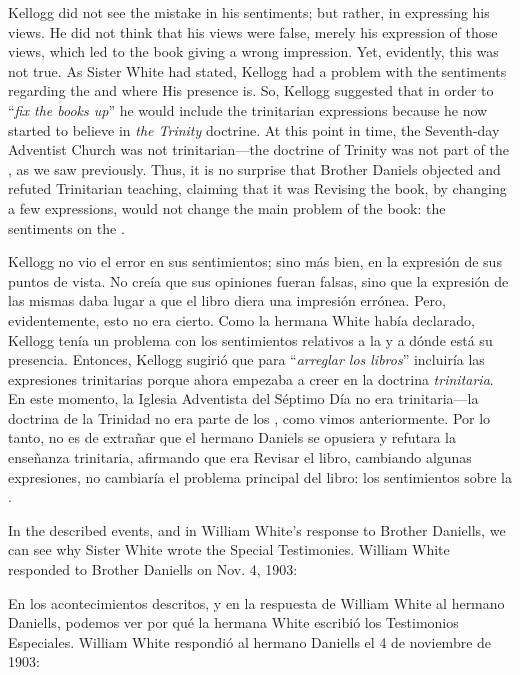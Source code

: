 Kellogg did not see the mistake in his sentiments; but rather, in expressing his views. He did not think that his views were false, merely his expression of those views, which led to the book giving a wrong impression. Yet, evidently, this was not true. As Sister White had stated, Kellogg had a problem with the sentiments regarding the  and where His presence is. So, Kellogg suggested that in order to “\textit{fix the books up}” he would include the trinitarian expressions because he now started to believe in \textit{the Trinity} doctrine. At this point in time, the Seventh-day Adventist Church was not trinitarian—the doctrine of Trinity was not part of the , as we saw previously. Thus, it is no surprise that Brother Daniels objected and refuted Trinitarian teaching, claiming that it was Revising the book, by changing a few expressions, would not change the main problem of the book: the sentiments on the .


Kellogg no vio el error en sus sentimientos; sino más bien, en la expresión de sus puntos de vista. No creía que sus opiniones fueran falsas, sino que la expresión de las mismas daba lugar a que el libro diera una impresión errónea. Pero, evidentemente, esto no era cierto. Como la hermana White había declarado, Kellogg tenía un problema con los sentimientos relativos a la  y a dónde está su presencia. Entonces, Kellogg sugirió que para “\textit{arreglar los libros}” incluiría las expresiones trinitarias porque ahora empezaba a creer en la doctrina \textit{trinitaria}. En este momento, la Iglesia Adventista del Séptimo Día no era trinitaria—la doctrina de la Trinidad no era parte de los , como vimos anteriormente. Por lo tanto, no es de extrañar que el hermano Daniels se opusiera y refutara la enseñanza trinitaria, afirmando que era Revisar el libro, cambiando algunas expresiones, no cambiaría el problema principal del libro: los sentimientos sobre la .


In the described events, and in William White's response to Brother Daniells, we can see why Sister White wrote the Special Testimonies. William White responded to Brother Daniells on Nov. 4, 1903:


En los acontecimientos descritos, y en la respuesta de William White al hermano Daniells, podemos ver por qué la hermana White escribió los Testimonios Especiales. William White respondió al hermano Daniells el 4 de noviembre de 1903:



